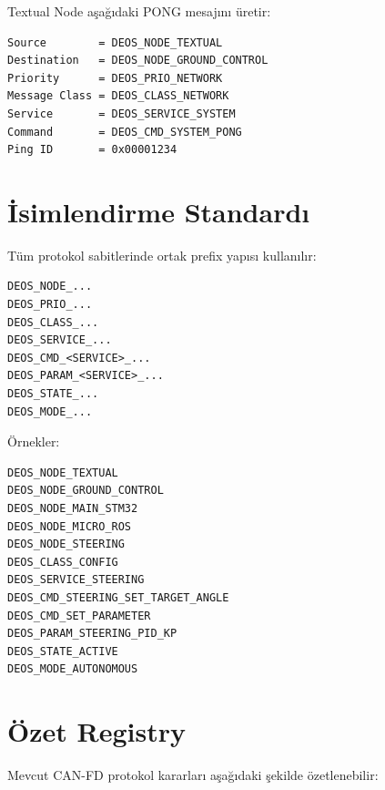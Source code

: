 \documentclass[a4paper,10pt]{article}
\begin{document}
Textual Node aşağıdaki PONG mesajını üretir:

\begin{verbatim}
Source        = DEOS_NODE_TEXTUAL
Destination   = DEOS_NODE_GROUND_CONTROL
Priority      = DEOS_PRIO_NETWORK
Message Class = DEOS_CLASS_NETWORK
Service       = DEOS_SERVICE_SYSTEM
Command       = DEOS_CMD_SYSTEM_PONG
Ping ID       = 0x00001234
\end{verbatim}


\section{İsimlendirme Standardı}

Tüm protokol sabitlerinde ortak prefix yapısı kullanılır:

\begin{verbatim}
DEOS_NODE_...
DEOS_PRIO_...
DEOS_CLASS_...
DEOS_SERVICE_...
DEOS_CMD_<SERVICE>_...
DEOS_PARAM_<SERVICE>_...
DEOS_STATE_...
DEOS_MODE_...
\end{verbatim}

Örnekler:

\begin{verbatim}
DEOS_NODE_TEXTUAL
DEOS_NODE_GROUND_CONTROL
DEOS_NODE_MAIN_STM32
DEOS_NODE_MICRO_ROS
DEOS_NODE_STEERING
DEOS_CLASS_CONFIG
DEOS_SERVICE_STEERING
DEOS_CMD_STEERING_SET_TARGET_ANGLE
DEOS_CMD_SET_PARAMETER
DEOS_PARAM_STEERING_PID_KP
DEOS_STATE_ACTIVE
DEOS_MODE_AUTONOMOUS
\end{verbatim}


\section{Özet Registry}

Mevcut CAN-FD protokol kararları aşağıdaki şekilde özetlenebilir:
\end{document}
